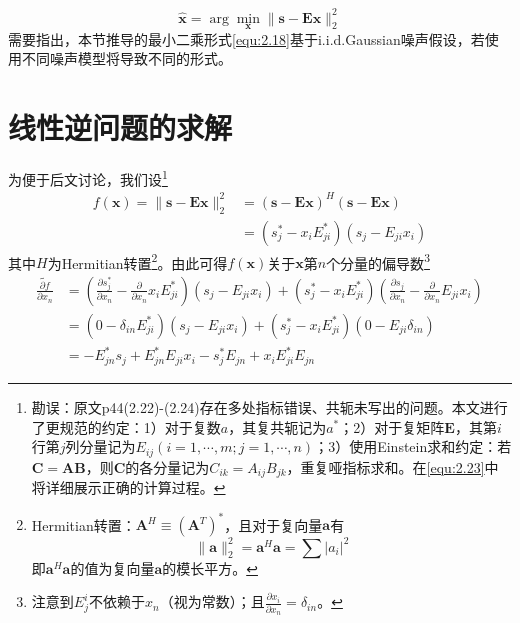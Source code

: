 \documentclass[12pt]{article}
\begin{document}
\begin{equation}
    \boxed{\hat{\bm{x}}=\arg\min_{\bm{x}}\|\bm{s}-\mathbf{E}\bm{x}\|_2^2}
    \label{equ:2.18}
\end{equation}
需要指出，本节推导的最小二乘形式\autoref{equ:2.18}基于i.i.d.Gaussian噪声假设，若使用不同噪声模型将导致不同的形式。

\section{线性逆问题的求解}\label{chap:2.4}
为便于后文讨论，我们设\footnote{勘误：原文p44(2.22)-(2.24)存在多处指标错误、共轭未写出的问题。本文进行了更规范的约定：1）对于复数$a$，其复共轭记为$a^*$；2）对于复矩阵$\mathbf{E}$，其第$i$行第$j$列分量记为$E_{ij}(i=1,\cdots,m;j=1,\cdots,n)$；3）使用Einstein求和约定：若$\mathbf{C}=\mathbf{A}\mathbf{B}$，则$\mathbf{C}$的各分量记为$C_{ik}=A_{ij} B_{jk}$，重复哑指标求和。在\autoref{equ:2.23}中将详细展示正确的计算过程。}
\begin{equation}
    \begin{aligned}
        f(\bm{x})=\|\bm{s}-\mathbf{E}\bm{x}\|_2^2
        &=(\bm{s}-\mathbf{E}\bm{x})^H(\bm{s}-\mathbf{E}\bm{x}) \\
        &=\left(s_j^*-x_i E_{ji}^*\right)\left(s_j-E_{ji} x_i\right)
        \label{equ:2.19}
    \end{aligned}
\end{equation}
其中$H$为Hermitian转置\footnote{Hermitian转置：$\mathbf{A}^H\equiv\left(\mathbf{A}^T\right)^*$，且对于复向量$\bm{a}$有
\begin{equation}
    \|\bm{a}\|_2^2=\bm{a}^H\bm{a}=\sum |a_i|^2
\end{equation}
即$\bm{a}^H\bm{a}$的值为复向量$\bm{a}$的模长平方。}。由此可得$f(\bm{x})$关于$\bm{x}$第$n$个分量的偏导数\footnote{注意到$E^i_j$不依赖于$x_n$（视为常数）；且$\frac{\partial x_i}{\partial x_n}=\delta_{in}$。}
\begin{equation}
    \begin{aligned}
        \widetilde{\frac{\partial f}{\partial x_n}}&=\left(\frac{\partial s_j^*}{\partial x_n}-\frac{\partial}{\partial x_n}x_i E_{ji}^*\right)\left(s_j-E_{ji} x_i\right)+\left(s_j^*-x_i E_{ji}^*\right)\left(\frac{\partial s_j}{\partial x_n}-\frac{\partial}{\partial x_n}E_{ji} x_i\right) \\
        &=\left(0-\delta_{in}E_{ji}^*\right)\left(s_j-E_{ji} x_i\right)+\left(s_j^*-x_i E_{ji}^*\right)\left(0 - E_{ji}\delta_{in}\right) \\
        &=-E_{jn}^* s_j+E_{jn}^* E_{ji} x_i-s_j^* E_{jn}+x_i E_{ji}^* E_{jn}
    \end{aligned}
    \label{equ:2.23}
\end{equation}
\end{document}
